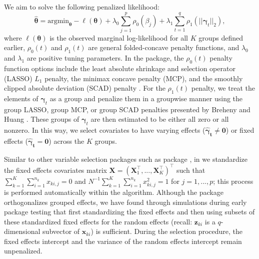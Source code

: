 We aim to solve the following penalized likelihood: \begin{equation}
  \widehat{\boldsymbol\theta} = \text{argmin}_{\boldsymbol\theta} - \ell (\boldsymbol\theta) + \lambda_0 \sum_{j=1}^{p} \rho_0 \left (\beta_j \right ) + \lambda_1 \sum_{t=1}^{q} \rho_1 \left (||\boldsymbol\gamma_t||_2 \right ),
  \label{eqn:penlik}
\end{equation} where \(\ell(\boldsymbol \theta)\) is the observed
marginal log-likelihood for all \(K\) groups defined earlier,
\(\rho_0(t)\) and \(\rho_1(t)\) are general folded-concave penalty
functions, and \(\lambda_0\) and \(\lambda_1\) are positive tuning
parameters. In the  package, the \(\rho_0(t)\) penalty
function options include the least absolute shrinkage and selection operator (LASSO) \(L_1\) penalty, the minimax concave penalty (MCP), and the smoothly clipped absolute deviation (SCAD) penalty \citep{glmnet2010, ncvreg2011}. For the
\(\rho_1(t)\) penalty, we treat the elements of \(\boldsymbol \gamma_t\)
as a group and penalize them in a groupwise manner using the group
LASSO, group MCP, or group SCAD penalties presented by Breheny and Huang
\citeyearpar{grpreg2015}. These groups of \(\boldsymbol \gamma_t\) are
then estimated to be either all zero or all nonzero. In this way, we
select covariates to have varying effects
(\(\boldsymbol{\widehat \gamma_t} \ne \boldsymbol 0\)) or fixed effects
(\(\boldsymbol{\widehat \gamma_t} = \boldsymbol 0\)) across the \(K\)
groups.

Similar to other variable selection packages such as package 
\citep{ncvreg2011}, in  we standardize the fixed effects covariates matrix
\(\boldsymbol X = (\boldsymbol X_1^\top,...,\boldsymbol X_K^\top)^\top\) such
that \\ \(\sum_{k=1}^K \sum_{i=1}^{n_{k}} x_{ki,j} = 0\) and
\(N^{-1} \sum_{k=1}^K \sum_{i=1}^{n_{k}} x_{ki,j}^2 = 1\) for
\(j = 1,...,p\); this process is performed automatically within the algorithm. Although the package  \citep{grpreg2015}
orthogonalizes grouped effects, we have found through simulations during early package testing that
first standardizing the fixed effects and then using subsets of these
standardized fixed effects for the random effects (recall:
\(\boldsymbol z_{ki}\) is a \(q\)-dimensional subvector of
\(\boldsymbol x_{ki}\)) is sufficient. During the selection procedure,
the fixed effects intercept and the variance of the random effects intercept remain unpenalized.

